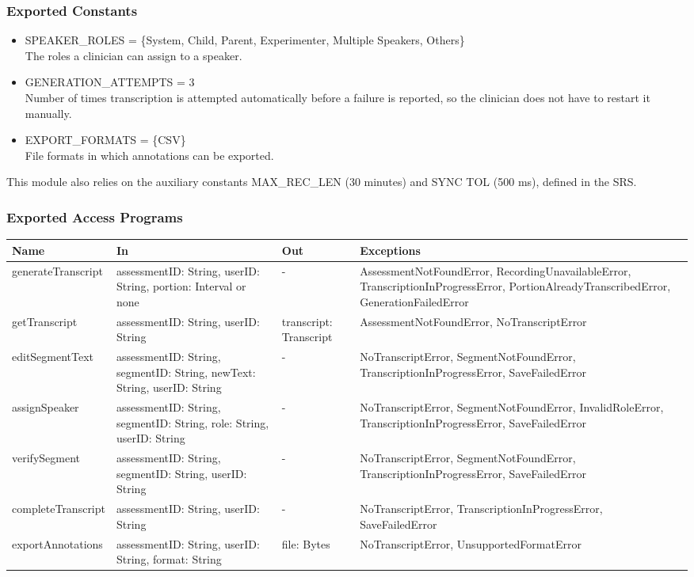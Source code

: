 \documentclass[12pt, titlepage]{article}
\begin{document}
\subsubsection{Exported Constants}
\begin{itemize}
\item SPEAKER\_ROLES = \{System, Child, Parent, Experimenter, Multiple Speakers, Others\}\\
The roles a clinician can assign to a speaker.
\item GENERATION\_ATTEMPTS = 3\\
Number of times transcription is attempted automatically before a failure is reported, so the clinician does not have to restart it manually.
\item EXPORT\_FORMATS = \{CSV\}\\
File formats in which annotations can be exported.
\end{itemize}
This module also relies on the auxiliary constants MAX\_REC\_LEN (30 minutes) and SYNC TOL (500 ms), defined in the SRS.

\subsubsection{Exported Access Programs}
\begin{center}
\begin{tabular}{p{3.2cm} p{4.3cm} p{3cm} p{4.5cm}}
\hline
\textbf{Name} & \textbf{In} & \textbf{Out} & \textbf{Exceptions} \\
\hline
generateTranscript & assessmentID: String, userID: String, portion: Interval or none & - & AssessmentNotFoundError, RecordingUnavailableError, TranscriptionInProgressError, PortionAlreadyTranscribedError, GenerationFailedError \\
getTranscript & assessmentID: String, userID: String & transcript: Transcript & AssessmentNotFoundError, NoTranscriptError \\
editSegmentText & assessmentID: String, segmentID: String, newText: String, userID: String & - & NoTranscriptError, SegmentNotFoundError, TranscriptionInProgressError, SaveFailedError \\
assignSpeaker & assessmentID: String, segmentID: String, role: String, userID: String & - & NoTranscriptError, SegmentNotFoundError, InvalidRoleError, TranscriptionInProgressError, SaveFailedError \\
verifySegment & assessmentID: String, segmentID: String, userID: String & - & NoTranscriptError, SegmentNotFoundError, TranscriptionInProgressError, SaveFailedError \\
completeTranscript & assessmentID: String, userID: String & - & NoTranscriptError, TranscriptionInProgressError, SaveFailedError \\
exportAnnotations & assessmentID: String, userID: String, format: String & file: Bytes & NoTranscriptError, UnsupportedFormatError \\
\hline
\end{tabular}
\end{center}
\end{document}
